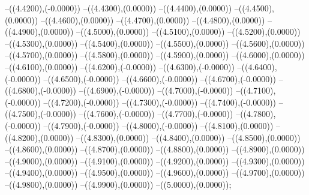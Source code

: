 {	--({\sx*(4.4200)},{\sy*(-0.0000)})
	--({\sx*(4.4300)},{\sy*(0.0000)})
	--({\sx*(4.4400)},{\sy*(0.0000)})
	--({\sx*(4.4500)},{\sy*(0.0000)})
	--({\sx*(4.4600)},{\sy*(0.0000)})
	--({\sx*(4.4700)},{\sy*(0.0000)})
	--({\sx*(4.4800)},{\sy*(0.0000)})
	--({\sx*(4.4900)},{\sy*(0.0000)})
	--({\sx*(4.5000)},{\sy*(0.0000)})
	--({\sx*(4.5100)},{\sy*(0.0000)})
	--({\sx*(4.5200)},{\sy*(0.0000)})
	--({\sx*(4.5300)},{\sy*(0.0000)})
	--({\sx*(4.5400)},{\sy*(0.0000)})
	--({\sx*(4.5500)},{\sy*(0.0000)})
	--({\sx*(4.5600)},{\sy*(0.0000)})
	--({\sx*(4.5700)},{\sy*(0.0000)})
	--({\sx*(4.5800)},{\sy*(0.0000)})
	--({\sx*(4.5900)},{\sy*(0.0000)})
	--({\sx*(4.6000)},{\sy*(0.0000)})
	--({\sx*(4.6100)},{\sy*(0.0000)})
	--({\sx*(4.6200)},{\sy*(-0.0000)})
	--({\sx*(4.6300)},{\sy*(-0.0000)})
	--({\sx*(4.6400)},{\sy*(-0.0000)})
	--({\sx*(4.6500)},{\sy*(-0.0000)})
	--({\sx*(4.6600)},{\sy*(-0.0000)})
	--({\sx*(4.6700)},{\sy*(-0.0000)})
	--({\sx*(4.6800)},{\sy*(-0.0000)})
	--({\sx*(4.6900)},{\sy*(-0.0000)})
	--({\sx*(4.7000)},{\sy*(-0.0000)})
	--({\sx*(4.7100)},{\sy*(-0.0000)})
	--({\sx*(4.7200)},{\sy*(-0.0000)})
	--({\sx*(4.7300)},{\sy*(-0.0000)})
	--({\sx*(4.7400)},{\sy*(-0.0000)})
	--({\sx*(4.7500)},{\sy*(-0.0000)})
	--({\sx*(4.7600)},{\sy*(-0.0000)})
	--({\sx*(4.7700)},{\sy*(-0.0000)})
	--({\sx*(4.7800)},{\sy*(-0.0000)})
	--({\sx*(4.7900)},{\sy*(-0.0000)})
	--({\sx*(4.8000)},{\sy*(-0.0000)})
	--({\sx*(4.8100)},{\sy*(0.0000)})
	--({\sx*(4.8200)},{\sy*(0.0000)})
	--({\sx*(4.8300)},{\sy*(0.0000)})
	--({\sx*(4.8400)},{\sy*(0.0000)})
	--({\sx*(4.8500)},{\sy*(0.0000)})
	--({\sx*(4.8600)},{\sy*(0.0000)})
	--({\sx*(4.8700)},{\sy*(0.0000)})
	--({\sx*(4.8800)},{\sy*(0.0000)})
	--({\sx*(4.8900)},{\sy*(0.0000)})
	--({\sx*(4.9000)},{\sy*(0.0000)})
	--({\sx*(4.9100)},{\sy*(0.0000)})
	--({\sx*(4.9200)},{\sy*(0.0000)})
	--({\sx*(4.9300)},{\sy*(0.0000)})
	--({\sx*(4.9400)},{\sy*(0.0000)})
	--({\sx*(4.9500)},{\sy*(0.0000)})
	--({\sx*(4.9600)},{\sy*(0.0000)})
	--({\sx*(4.9700)},{\sy*(0.0000)})
	--({\sx*(4.9800)},{\sy*(0.0000)})
	--({\sx*(4.9900)},{\sy*(0.0000)})
	--({\sx*(5.0000)},{\sy*(0.0000)});
}
